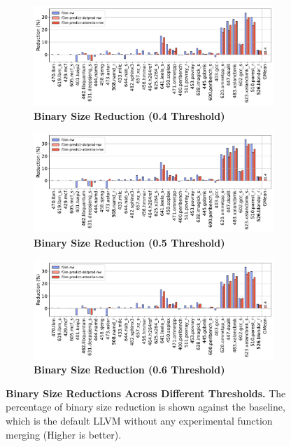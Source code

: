 \begin{figure}[tbh!]
    \centering
    \begin{subfigure}{\textwidth}
        \centering
        \includegraphics[scale=0.47]{Figures/CodeSizeAnalysis/0.4_binsize_code-size-reduction.pdf}
        \caption{\textbf{Binary Size Reduction (\textbf{0.4} Threshold)}} 
        \label{fig:0.4BinSizeCodeSize}
    \end{subfigure}
    \begin{subfigure}{\textwidth}
        \centering
        \includegraphics[scale=0.47]{Figures/CodeSizeAnalysis/0.5_binsize_code-size-reduction.pdf}
        \caption{\textbf{Binary Size Reduction (\textbf{0.5} Threshold)}} 
        \label{fig:0.5BinSizeCodeSize}
    \end{subfigure}
    \begin{subfigure}{\textwidth}
    \centering
        \includegraphics[scale=0.47]{Figures/CodeSizeAnalysis/0.6_binsize_code-size-reduction.pdf}
        \caption{\textbf{Binary Size Reduction (\textbf{0.6} Threshold)}} 
        \label{fig:0.6BinSizeCodeSize}
    \end{subfigure}

    \caption{\textbf{Binary Size Reductions Across Different Thresholds.} The percentage of binary size reduction is shown against the baseline, which is the default LLVM without any experimental function merging (Higher is better).}
\label{fig:binSizeComparison}
    \label{fig:binSizeComparison}
\end{figure}

